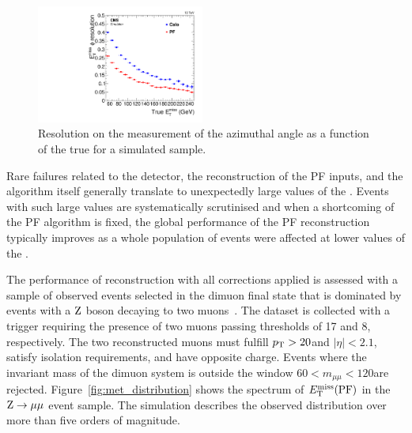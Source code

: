 \begin{figure}[htbp]
\centering
\includegraphics[width=0.49\textwidth]{figs/cms/met_phi_vs_truemet.pdf}
\caption{
Resolution on the measurement of the \vecMET azimuthal angle as a function of the true \MET for a simulated \ttbar sample.
\label{fig:expected_performance_met_phi_resolution}}
\end{figure}

Rare failures related to the detector, the reconstruction of the PF inputs, 
and the algorithm itself generally translate to unexpectedly large values of the \MET.
Events with such large values are systematically scrutinised and when a shortcoming of the PF algorithm is fixed, 
the global performance of the PF reconstruction typically improves as a whole population of events were affected at lower values
of the \MET. 

The performance of \VEtmiss reconstruction with all corrections
applied is assessed with a sample
of observed events selected in the dimuon final state that is
dominated by events with a $\mathrm{Z}$ boson decaying to two
muons~\cite{Khachatryan:2014gga}. The dataset is collected with a
trigger requiring the presence of two muons passing \pt thresholds of
17 and 8\GeV, respectively. The two reconstructed muons must fulfill $p_{\mathrm{T}} > 20 $\GeV and $|\eta| <
2.1$, satisfy isolation requirements, and have opposite charge. Events where the invariant mass of the dimuon system is outside the
window $60<m_{\mu\mu}<120$\GeV are rejected.
Figure~\ref{fig:met_distribution} shows the spectrum
of $E_{\mathrm{T}}^{\text{miss}} ({\mathrm{PF}})$ in the $\mathrm{Z}\rightarrow\mu\mu$ event sample. The
simulation describes the observed distribution over more than five
orders of magnitude.

